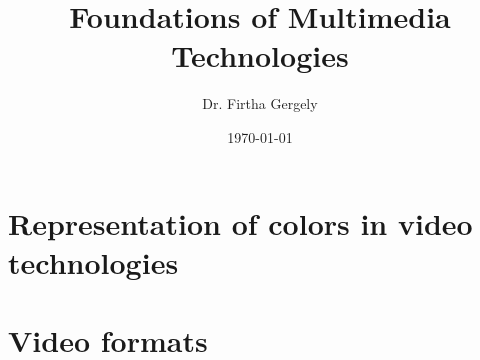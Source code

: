 \documentclass{book}
\title{Foundations of Multimedia Technologies}
\author{Dr. Firtha Gergely}
\date{\today}
\begin{document}
\sloppy 


\titlepage
\maketitle
\cleardoublepage 
  
\tableofcontents

\setcounter{page}{1}			%
% 
%
%

\chapter{Representation of colors in video technologies}
\label{sec:video_color_representation}
 

\chapter{Video formats}
\label{sec:video_formats}
 

% 
%
% 
\end{document}
